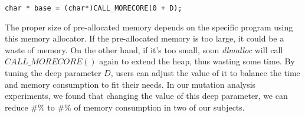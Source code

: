 \begin{lstlisting}
char * base = (char*)CALL_MORECORE(0 + D);
\end{lstlisting}

The proper size of pre-allocated memory depends on the specific program using this memory allocator. If the pre-allocated memory is too large, it could be a waste of memory. On the other hand, if it's too small, soon \emph{dlmalloc} will call $CALL\_MORECORE()$ again to extend the heap, thus wasting some time. By tuning the deep parameter $D$, users can adjust the value of it to balance the time and memory consumption to fit their needs. In our mutation analysis experiments,  we found that changing the value of this deep parameter, we can reduce \#\% to \#\% of memory consumption in two of our subjects.

